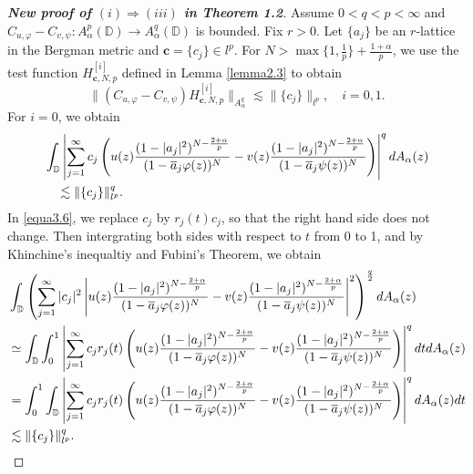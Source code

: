 \documentclass[10pt,a4paper]{amsart}
\begin{document}
\begin{proof}[{\bf New proof of $(i)\Rightarrow (iii)$ in Theorem 1.2}]
Assume $0<q<p<\infty$ and $C_{u,\varphi}-C_{v,\psi}: A_{\alpha}^p(\mathbb{D})\to A_{\alpha}^q(\mathbb{D})$ is bounded. Fix $r>0$. Let $\{a_j\}$ be an $r$-lattice in the Bergman metric and $\mathbf{c}=\{c_j\}\in l^p$. For $N>\max\{1,\frac{1}{p}\}+\frac{1+\alpha}{p}$, we use the test function $H_{\mathbf{c},N,p}^{[i]}$ defined in Lemma \ref{lemma2.3} to obtain
\begin{equation*}
\|(C_{u,\varphi}-C_{v,\psi})H_{\mathbf{c},N,p}^{[i]}\|_{A_{\alpha}^q}\lesssim \|\{c_j\}\|_{l^p}, \quad i=0,1.
\end{equation*}
For $i=0$, we obtain
\begin{equation}\label{equa3.6}
\begin{split}
&\int_{\mathbb{D}}\left|\sum_{j=1}^{\infty}c_j\left(u(z)\frac{(1-|a_j|^2)^{N-\frac{2+\alpha}{p}}}{(1-\overline{a}_j\varphi(z))^N}-v(z)\frac{(1-|a_j|^2)^{N-\frac{2+\alpha}{p}}}{(1-\overline{a}_j\psi(z))^N}\right)\right|^q{\rm d}A_{\alpha}(z)\\
&\quad \lesssim \|\{c_j\}\|_{l^p}^q.
\end{split}
\end{equation}
In \eqref{equa3.6}, we replace $c_j$ by $r_j(t)c_j$, so that the right hand side does not change. Then intergrating both sides with respect to $t$ from 0 to 1, and by Khinchine's inequaltiy and Fubini's Theorem, we obtain
\begin{equation*}
\begin{split}
&\int_{\mathbb{D}}\left(\sum_{j=1}^{\infty}|c_j|^2\left|u(z)\frac{(1-|a_j|^2)^{N-\frac{2+\alpha}{p}}}{(1-\overline{a}_j\varphi(z))^N}-v(z)\frac{(1-|a_j|^2)^{N-\frac{2+\alpha}{p}}}{(1-\overline{a}_j\psi(z))^N}\right|^2\right)^{\frac{q}{2}}{\rm d}A_{\alpha}(z)\\
&\simeq\int_{\mathbb{D}}\int_0^1\left|\sum_{j=1}^{\infty}c_jr_j(t)\left(u(z)\frac{(1-|a_j|^2)^{N-\frac{2+\alpha}{p}}}{(1-\overline{a}_j\varphi(z))^N}-v(z)\frac{(1-|a_j|^2)^{N-\frac{2+\alpha}{p}}}{(1-\overline{a}_j\psi(z))^N}\right)\right|^q{\rm d}t{\rm d}A_{\alpha}(z)\\
&=\int_{0}^1\int_{\mathbb{D}}\left|\sum_{j=1}^{\infty}c_jr_j(t)\left(u(z)\frac{(1-|a_j|^2)^{N-\frac{2+\alpha}{p}}}{(1-\overline{a}_j\varphi(z))^N}-v(z)\frac{(1-|a_j|^2)^{N-\frac{2+\alpha}{p}}}{(1-\overline{a}_j\psi(z))^N}\right)\right|^q{\rm d}A_{\alpha}(z){\rm d}t\\
&\lesssim \|\{c_j\}\|_{l^p}^q.
\end{split}

\end{equation*}
\end{proof}
\end{document}
